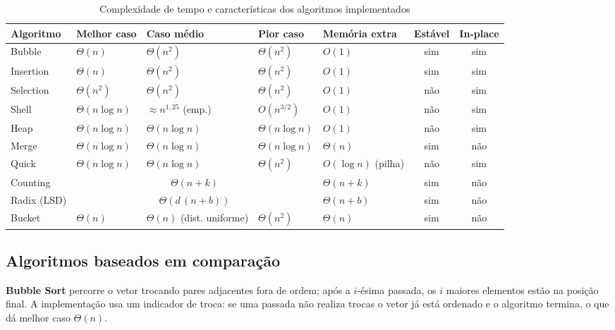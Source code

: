 \documentclass[11pt,a4paper]{article}
\begin{document}
\begin{table}[htbp]\centering\small
\caption{Complexidade de tempo e características dos algoritmos implementados}\label{tab:complexidades}
\setlength{\tabcolsep}{3.5pt}\footnotesize
\begin{tabular}{lllllcc}
\toprule
Algoritmo & Melhor caso & Caso médio & Pior caso & Memória extra & Estável & In-place \\
\midrule
Bubble    & $\Theta(n)$         & $\Theta(n^2)$       & $\Theta(n^2)$        & $O(1)$       & sim & sim \\
Insertion & $\Theta(n)$         & $\Theta(n^2)$       & $\Theta(n^2)$        & $O(1)$       & sim & sim \\
Selection & $\Theta(n^2)$       & $\Theta(n^2)$       & $\Theta(n^2)$        & $O(1)$       & não & sim \\
Shell     & $\Theta(n\log n)$   & $\approx n^{1{,}25}$ (emp.) & $O(n^{3/2})$ & $O(1)$       & não & sim \\
Heap      & $\Theta(n\log n)$   & $\Theta(n\log n)$   & $\Theta(n\log n)$    & $O(1)$       & não & sim \\
Merge     & $\Theta(n\log n)$   & $\Theta(n\log n)$   & $\Theta(n\log n)$    & $\Theta(n)$  & sim & não \\
Quick     & $\Theta(n\log n)$   & $\Theta(n\log n)$   & $\Theta(n^2)$        & $O(\log n)$ (pilha) & não & sim \\
\midrule
Counting  & \multicolumn{3}{c}{$\Theta(n+k)$}                               & $\Theta(n+k)$ & sim & não \\
Radix (LSD) & \multicolumn{3}{c}{$\Theta(d\,(n+b))$}                        & $\Theta(n+b)$ & sim & não \\
Bucket    & $\Theta(n)$         & $\Theta(n)$ (dist. uniforme) & $\Theta(n^2)$ & $\Theta(n)$  & sim & não \\
\bottomrule
\end{tabular}
\end{table}

\subsection{Algoritmos baseados em comparação}

\textbf{Bubble Sort} percorre o vetor trocando pares adjacentes fora de ordem; após a $i$-ésima
passada, os $i$ maiores elementos estão na posição final. A implementação usa um indicador de
troca: se uma passada não realiza trocas o vetor já está ordenado e o algoritmo termina, o que
dá melhor caso $\Theta(n)$.
\end{document}

